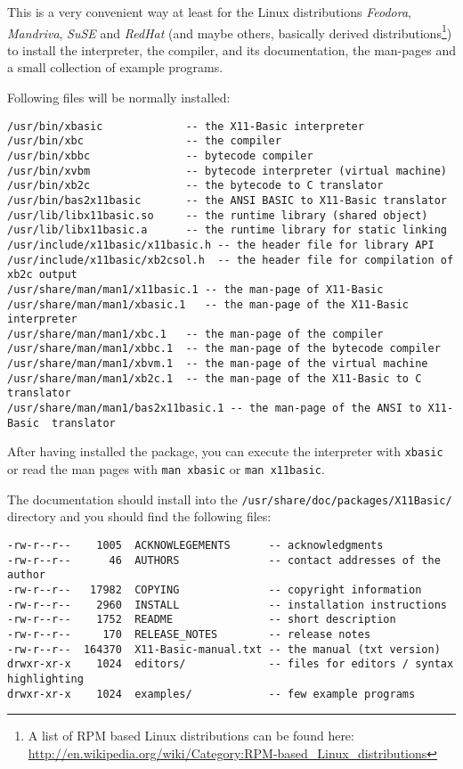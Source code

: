 This is a very convenient way at least for the Linux distributions  {\it
Feodora}, {\it Mandriva}, {\it SuSE} and {\it RedHat} (and maybe others,
basically derived distributions\footnote{A list of RPM based Linux distributions
can be found here:
\url{http://en.wikipedia.org/wiki/Category:RPM-based_Linux_distributions}}) to
install the interpreter, the compiler,  and its documentation, the man-pages and
a small collection of example programs. 

Following files will be normally installed:
{\footnotesize
\begin{verbatim}
/usr/bin/xbasic             -- the X11-Basic interpreter
/usr/bin/xbc                -- the compiler
/usr/bin/xbbc               -- bytecode compiler
/usr/bin/xvbm               -- bytecode interpreter (virtual machine)
/usr/bin/xb2c               -- the bytecode to C translator
/usr/bin/bas2x11basic       -- the ANSI BASIC to X11-Basic translator
/usr/lib/libx11basic.so     -- the runtime library (shared object)
/usr/lib/libx11basic.a      -- the runtime library for static linking
/usr/include/x11basic/x11basic.h -- the header file for library API
/usr/include/x11basic/xb2csol.h  -- the header file for compilation of xb2c output
/usr/share/man/man1/x11basic.1 -- the man-page of X11-Basic
/usr/share/man/man1/xbasic.1   -- the man-page of the X11-Basic interpreter
/usr/share/man/man1/xbc.1   -- the man-page of the compiler
/usr/share/man/man1/xbbc.1  -- the man-page of the bytecode compiler
/usr/share/man/man1/xbvm.1  -- the man-page of the virtual machine
/usr/share/man/man1/xb2c.1  -- the man-page of the X11-Basic to C translator
/usr/share/man/man1/bas2x11basic.1 -- the man-page of the ANSI to X11-Basic  translator
\end{verbatim}
}

After having installed the package, you can execute the interpreter 
with \verb|xbasic| or read the man pages with \verb|man xbasic| or 
\verb|man x11basic|.

The documentation should install into the 
\verb|/usr/share/doc/packages/X11Basic/| directory 
and you should find the following files:
{\footnotesize
\begin{verbatim}
-rw-r--r--    1005  ACKNOWLEGEMENTS      -- acknowledgments
-rw-r--r--      46  AUTHORS              -- contact addresses of the author
-rw-r--r--   17982  COPYING              -- copyright information
-rw-r--r--    2960  INSTALL              -- installation instructions
-rw-r--r--    1752  README               -- short description
-rw-r--r--     170  RELEASE_NOTES        -- release notes
-rw-r--r--  164370  X11-Basic-manual.txt -- the manual (txt version)
drwxr-xr-x    1024  editors/             -- files for editors / syntax highlighting
drwxr-xr-x    1024  examples/            -- few example programs
\end{verbatim}
}

